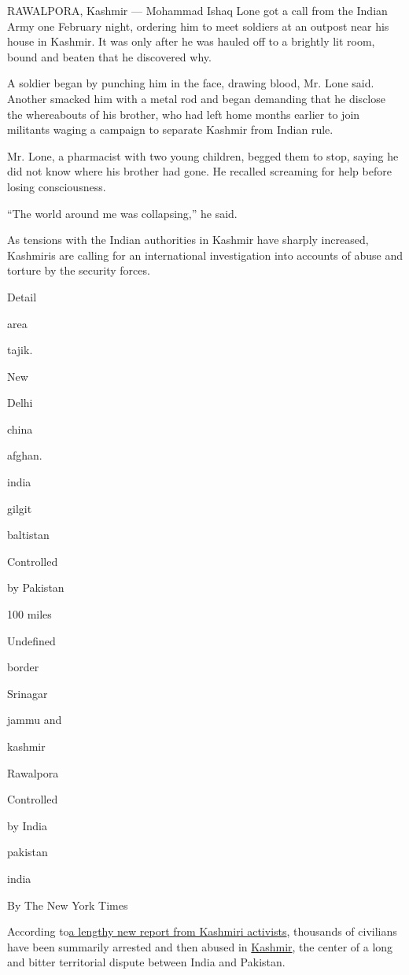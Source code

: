 RAWALPORA, Kashmir --- Mohammad Ishaq Lone got a call from the Indian
Army one February night, ordering him to meet soldiers at an outpost
near his house in Kashmir. It was only after he was hauled off to a
brightly lit room, bound and beaten that he discovered why.

A soldier began by punching him in the face, drawing blood, Mr. Lone
said. Another smacked him with a metal rod and began demanding that he
disclose the whereabouts of his brother, who had left home months
earlier to join militants waging a campaign to separate Kashmir from
Indian rule.

Mr. Lone, a pharmacist with two young children, begged them to stop,
saying he did not know where his brother had gone. He recalled screaming
for help before losing consciousness.

``The world around me was collapsing,'' he said.

As tensions with the Indian authorities in Kashmir have sharply
increased, Kashmiris are calling for an international investigation into
accounts of abuse and torture by the security forces.

Detail

area

tajik.

New

Delhi

china

afghan.

india

gilgit

baltistan

Controlled

by Pakistan

100 miles

Undefined

border

Srinagar

jammu and

kashmir

Rawalpora

Controlled

by India

pakistan

india

By The New York Times

According
to\href{http://jkccs.net/wp-content/uploads/2019/05/TORTURE-Indian-State\%E2\%80\%99s-Instrument-of-Control-in-Indian-administered-Jammu-and-Kashmir.pdf}{a
lengthy new report from Kashmiri activists}, thousands of civilians have
been summarily arrested and then abused in
\href{https://www.nytimes.com/interactive/2019/world/asia/india-pakistan-crisis.html}{Kashmir},
the center of a long and bitter territorial dispute between India and
Pakistan.

